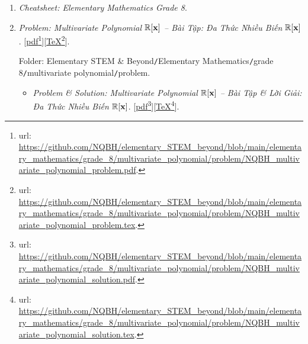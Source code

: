 \documentclass[12pt,oneside]{book}
\begin{document}
\begin{enumerate}
	\item {\it Cheatsheet: Elementary Mathematics Grade 8}.
	\item {\it Problem: Multivariate Polynomial $\mathbb{R}[{\bf x}]$ -- Bài Tập: Đa Thức Nhiều Biến $\mathbb{R}[{\bf x}]$}. [\href{https://github.com/NQBH/elementary_STEM_beyond/blob/main/elementary_mathematics/grade_8/multivariate_polynomial/problem/NQBH_multivariate_polynomial_problem.pdf}{pdf}\footnote{{\sc url}: \url{https://github.com/NQBH/elementary_STEM_beyond/blob/main/elementary_mathematics/grade_8/multivariate_polynomial/problem/NQBH_multivariate_polynomial_problem.pdf}.}][\href{https://github.com/NQBH/elementary_STEM_beyond/blob/main/elementary_mathematics/grade_8/multivariate_polynomial/problem/NQBH_multivariate_polynomial_problem.tex}{\TeX}\footnote{{\sc url}: \url{https://github.com/NQBH/elementary_STEM_beyond/blob/main/elementary_mathematics/grade_8/multivariate_polynomial/problem/NQBH_multivariate_polynomial_problem.tex}.}].
	
	Folder: {\sf Elementary STEM \& Beyond{\tt/}Elementary Mathematics{\tt/}grade 8{\tt/}multivariate polynomial{\tt/}problem}.
	\begin{itemize}
		\item {\it Problem \& Solution: Multivariate Polynomial $\mathbb{R}[{\bf x}]$ -- Bài Tập \& Lời Giải: Đa Thức Nhiều Biến $\mathbb{R}[{\bf x}]$}. [\href{https://github.com/NQBH/elementary_STEM_beyond/blob/main/elementary_mathematics/grade_8/multivariate_polynomial/problem/NQBH_multivariate_polynomial_solution.pdf}{pdf}\footnote{{\sc url}: \url{https://github.com/NQBH/elementary_STEM_beyond/blob/main/elementary_mathematics/grade_8/multivariate_polynomial/problem/NQBH_multivariate_polynomial_solution.pdf}.}][\href{https://github.com/NQBH/elementary_STEM_beyond/blob/main/elementary_mathematics/grade_8/multivariate_polynomial/problem/NQBH_multivariate_polynomial_solution.tex}{\TeX}\footnote{{\sc url}: \url{https://github.com/NQBH/elementary_STEM_beyond/blob/main/elementary_mathematics/grade_8/multivariate_polynomial/problem/NQBH_multivariate_polynomial_solution.tex}.}].
		

\end{itemize}
\end{enumerate}
\end{document}
